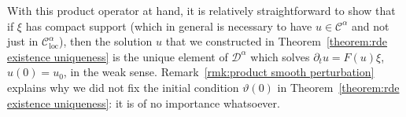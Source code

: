 \documentclass[11pt,a4paper]{article}
\newcommand{\tmop}[1]{\ensuremath{\operatorname{#1}}}
\theoremstyle{remark}
\newcommand{\CC}{\ensuremath{\mathscr{C}}}
\newcommand{\CD}{\ensuremath{\mathscr{D}}}
\begin{document}
  With this product operator at hand, it is relatively straightforward to show that if $\xi$ has compact support (which in general is necessary to have $u \in \CC^\alpha$ and not just in $\CC^\alpha_{\mathrm{loc}}$), then the solution $u$ that we constructed in Theorem~\ref{theorem:rde existence uniqueness} is the unique element of $\CD^\alpha$ which solves $\partial_t u = F(u) \xi$, $u(0) = u_0$, in the weak sense. Remark~\ref{rmk:product smooth perturbation} explains why we did not fix the initial condition $\vartheta(0)$ in Theorem~\ref{theorem:rde existence uniqueness}: it is of no importance whatsoever.
  
\end{document}
